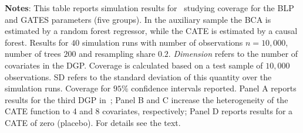 \documentclass[11pt, a4paper, leqno]{article}
\begin{document}
\begin{table}
\begin{threeparttable}
        \begin{tablenotes}
            \small
            \item \textbf{Notes}: This table reports simulation results for~\citet{chernozhukov2023genml} studying coverage for the BLP and GATES parameters (five groups).
            In the auxiliary sample the BCA is estimated by a random forest regressor, while the CATE is estimated by a causal forest.
            Results for $40$ simulation runs with number of observations $n=10,000$, number of trees $200$ and resampling share $0.2$.
            \textit{Dimension} refers to the number of covariates in the DGP\@.
            Coverage is calculated based on a test sample of $10,000$ observations. SD refers to the standard deviation of this quantity over the simulation runs.
            Coverage for $95\%$ confidence intervals reported.
            Panel A reports results for the third DGP in~\citet{wager2018estimation}; Panel B and C increase the heterogeneity of the CATE function to 4 and 8 covariates, respectively; Panel D reports results for a CATE of zero (placebo).
            For details see the text.
        \end{tablenotes}
    \end{threeparttable}
\end{table}
\end{document}
